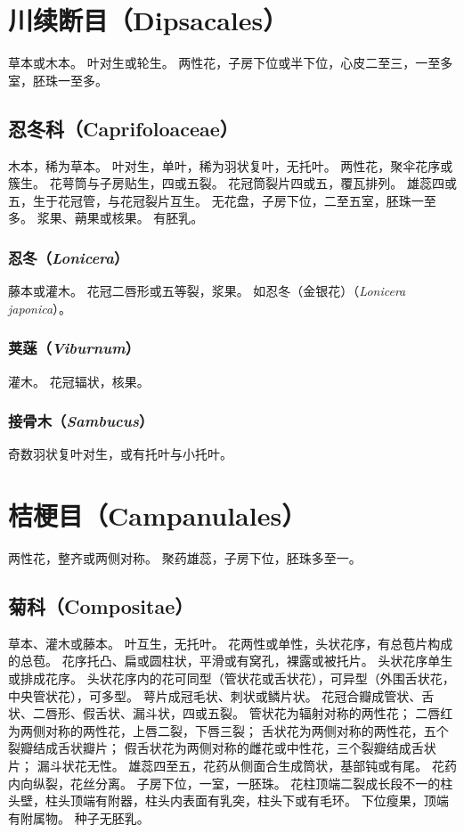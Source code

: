 \documentclass[11pt]{article}
\begin{document}
\begin{sloppypar}
\section{川续断目（Dipsacales）}
草本或木本。
叶对生或轮生。
两性花，子房下位或半下位，心皮二至三，一至多室，胚珠一至多。

\subsection{忍冬科（Caprifoloaceae）}
木本，稀为草本。
叶对生，单叶，稀为羽状复叶，无托叶。
两性花，聚伞花序或簇生。
花萼筒与子房贴生，四或五裂。
花冠筒裂片四或五，覆瓦排列。
雄蕊四或五，生于花冠管，与花冠裂片互生。
无花盘，子房下位，二至五室，胚珠一至多。
浆果、蒴果或核果。
有胚乳。

\subsubsection{忍冬（\textit{Lonicera}）}
藤本或灌木。
花冠二唇形或五等裂，浆果。
如忍冬（金银花）（\textit{Lonicera japonica}）。

\subsubsection{荚蒾（\textit{Viburnum}）}
灌木。
花冠辐状，核果。

\subsubsection{接骨木（\textit{Sambucus}）}
奇数羽状复叶对生，或有托叶与小托叶。

\section{桔梗目（Campanulales）}
两性花，整齐或两侧对称。
聚药雄蕊，子房下位，胚珠多至一。

\subsection{菊科（Compositae）}
草本、灌木或藤本。
叶互生，无托叶。
花两性或单性，头状花序，有总苞片构成的总苞。
花序托凸、扁或圆柱状，平滑或有窝孔，裸露或被托片。
头状花序单生或排成花序。
头状花序内的花可同型（管状花或舌状花），可异型（外围舌状花，中央管状花），可多型。
萼片成冠毛状、刺状或鳞片状。
花冠合瓣成管状、舌状、二唇形、假舌状、漏斗状，四或五裂。
管状花为辐射对称的两性花；
二唇红为两侧对称的两性花，上唇二裂，下唇三裂；
舌状花为两侧对称的两性花，五个裂瓣结成舌状瓣片；
假舌状花为两侧对称的雌花或中性花，三个裂瓣结成舌状片；
漏斗状花无性。
雄蕊四至五，花药从侧面合生成筒状，基部钝或有尾。
花药内向纵裂，花丝分离。
子房下位，一室，一胚珠。
花柱顶端二裂成长段不一的柱头壁，柱头顶端有附器，柱头内表面有乳突，柱头下或有毛环。
下位瘦果，顶端有附属物。
种子无胚乳。


\end{sloppypar}
\end{document}
